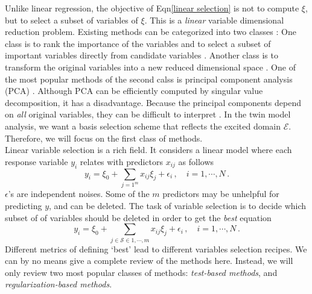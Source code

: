 \documentclass[a4paper,onecolumn]{article}
\theoremstyle{remark}
\begin{document}
Unlike linear regression, the objective of Eqn\eqref{linear selection} is not 
to compute $\xi$, but to select a subset of variables of $\xi$. This is a 
\emph{linear} variable dimensional reduction problem.
Existing methods can be categorized into two 
classes \cite{NARMAXbook}: One class is to rank the importance of the variables and to select 
a subset of important variables directly from candidate variables
\cite{Lasso variable selection, Billing
feature selection}. Another class is to transform the original variables into a new 
reduced dimensional space \cite{review dimensional reduction}.
One of the most popular methods of the second calss is principal component analysis (PCA)
\cite{PCA review}. Although PCA can be efficiently computed by singular value decomposition,
it has a disadvantage. Because the principal components depend on \emph{all} original
variables, they can be difficult to interpret \cite{NARMAXbook}. In the twin model
analysis, we want
a basis selection scheme that reflects the excited domain $\mathcal{E}$. Therefore,
we will focus on the first class of methods.\\

\noindent Linear variable selection is a rich field. It considers a linear model
where each response variable $y_i$ relates with predictors $x_{ij}$ as follows
\begin{equation}
    y_i = \xi_0 + \sum_{j=1^m} x_{ij}\xi_j + \epsilon_i \,, \quad i=1,\cdots, N\,.
\end{equation}
$\epsilon$'s are independent noises. Some of the $m$ predictors may be unhelpful
for predicting $y$, and can be deleted. The task of variable selection is to decide
which subset of of variables should be deleted in order to get the \emph{best} equation
\cite{Critical review of variable selection}
\begin{equation}
    y_i = \xi_0 + \sum_{j\in \mathcal{S}\in{1,\cdots,m}} x_{ij} \xi_j + \epsilon_i\,,
    \quad i=1,\cdots, N\,.
    \label{selected variable model}
\end{equation}
Different metrics of defining `best' lead to different variables selection recipes.
We can by no means give a complete review of the methods here. Instead, we will only review two 
most popular classes of methods: \emph{test-based methods}, and 
\emph{regularization-based methods}.\\
\end{document}
